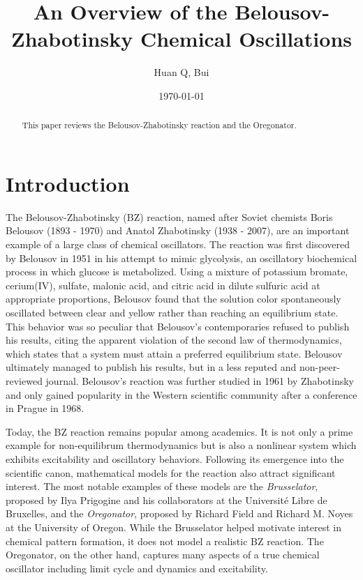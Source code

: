\documentclass[twocolumn,amsmath,amssymb,aps]{revtex4}
\begin{document}
\title{An Overview of the Belousov-Zhabotinsky Chemical Oscillations}%
\author{Huan Q, Bui}
\date{\today}
\begin{abstract}
This paper reviews the Belousov-Zhabotinsky reaction and the Oregonator. 
\end{abstract}
\maketitle




\section{\label{sec:level1}Introduction}
The Belousov-Zhabotinsky (BZ) reaction, named after Soviet chemists Boris Belousov (1893 - 1970) and Anatol Zhabotinsky (1938 - 2007), are an important example of a large class of chemical oscillators. The reaction was first discovered by Belousov in 1951 in his attempt to mimic glycolysis, an oscillatory biochemical process in which glucose is metabolized. Using a mixture of potassium bromate, cerium(IV), sulfate, malonic acid, and citric acid in dilute sulfuric acid at appropriate proportions, Belousov found that the solution color spontaneously oscillated between clear and yellow rather than reaching an equilibrium state. This behavior was so peculiar that Belousov's contemporaries refused to publish his results, citing the apparent violation of the second law of thermodynamics, which states that a system must attain a preferred equilibrium state. Belousov ultimately managed to publish his results, but in a less reputed and non-peer-reviewed journal. Belousov's reaction was further studied in 1961 by Zhabotinsky and only gained popularity in the Western scientific community after a conference in Prague in 1968.

Today, the BZ reaction remains popular among academics. It is not only a prime example for non-equilibrum thermodynamics but is also a nonlinear system which exhibits excitability and oscillatory behaviors. Following its emergence into the scientific canon, mathematical models for the reaction also attract significant interest. The most notable examples of these models are the \textit{Brusselator}, proposed by Ilya Prigogine and his collaborators at the Université Libre de Bruxelles, and the \textit{Oregonator}, proposed by Richard Field and Richard M. Noyes at the University of Oregon. While the Brusselator helped motivate interest in chemical pattern formation, it does not model a realistic BZ reaction. The Oregonator, on the other hand, captures many aspects of a true chemical oscillator including limit cycle and dynamics and excitability.
\end{document}
